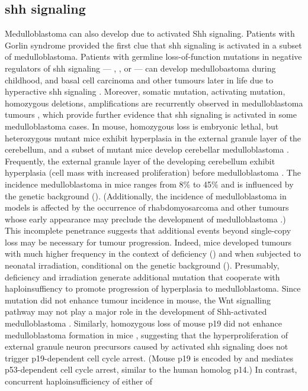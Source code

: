 \subsection{\gls{shh} signaling}

Medulloblastoma can also develop due to activated Shh signaling. Patients with Gorlin syndrome provided the first clue that \gls{shh} signaling is activated in a subset of medulloblastoma. Patients with germline loss-of-function mutations in negative regulators of \gls{shh} signaling --- , , or  --- can develop medullobastoma during childhood, and basal cell carcinoma and other tumours later in life due to hyperactive \gls{shh} signaling . Moreover, somatic  mutation, activating  mutation,  homozygous deletions,  amplifications are recurrently observed in medulloblastoma tumours , which provide further evidence that \gls{shh} signaling is activated in some medulloblastoma cases. In mouse, homozygous  loss is embryonic lethal, but heterozygous  mutant mice exhibit hyperplasia in the external granule layer of the cerebellum, and a subset of mutant mice develop cerebellar medulloblastoma . Frequently, the external granule layer of the developing cerebellum exhibit hyperplasia (cell mass with increased proliferation) before medulloblastoma . The incidence medulloblastoma in \high{+/-} mice ranges from 8\% to 45\% and is influenced by the genetic background (). (Additionally, the incidence of medulloblastoma in \high{+/-} models is affected by the occurrence of rhabdomyosarcoma and other tumours whose early appearance may preclude the development of medulloblastoma .) This incomplete penetrance suggests that additional events beyond single-copy  loss may be necessary for tumour progression. Indeed, \high{+/-} mice developed tumours with much higher frequency in the context of  deficiency () and when subjected to neonatal irradiation, conditional on the genetic background (). Presumably,  deficiency and irradiation generate additional mutation that cooperate with  haploinsuffiency to promote progression of hyperplasia to medulloblastoma. Since  mutation did not enhance tumour incidence in \high{+/-} mouse, the Wnt signalling pathway may not play a major role in the development of Shh-activated medulloblastoma . Similarly, homozygous loss of mouse p19 did not enhance medulloblastoma formation in \high{+/-} mice , suggesting that the hyperproliferation of external granule neuron precursors caused by activated \gls{shh} signaling does not trigger p19-dependent cell cycle arrest. (Mouse p19 is encoded by  and mediates p53-dependent cell cycle arrest, similar to the human homolog p14.) In contrast, concurrent haploinsufficiency of either of 